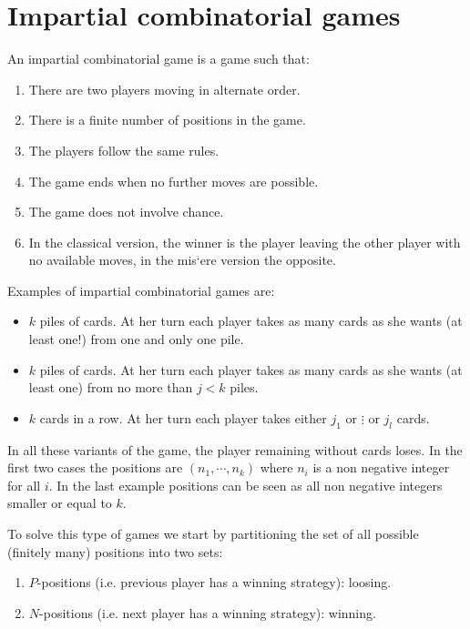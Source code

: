 \section{Impartial combinatorial games}

\begin{definition}
    An impartial combinatorial game is a game such that:
    \begin{enumerate}
        \item There are two players moving in alternate order.
        \item There is a finite number of positions in the game.
        \item The players follow the same rules.
        \item The game ends when no further moves are possible.
        \item The game does not involve chance.
        \item In the classical version, the winner is the player leaving the other player with no available moves, in the mis`ere version the opposite.
    \end{enumerate}
\end{definition}
\begin{example}
    Examples of impartial combinatorial games are: 
    \begin{itemize}
        \item $k$ piles of cards. At her turn each player takes as many cards as she wants (at least one!) from one and only one pile. 
        \item $k$ piles of cards. At her turn each player takes as many cards as she wants (at least one) from no more than $j < k$ piles. 
        \item $k$ cards in a row. At her turn each player takes either $j_1$ or $\vdots$ or $j_l$ cards. 
    \end{itemize}
    In all these variants of the game, the player remaining without cards loses.
    In the first two cases the positions are $(n_1, \cdots , n_k)$ where $n_i$ is a non negative integer for all $i$. 
    In the last example positions can be seen as all non negative integers smaller or equal to $k$.
\end{example}
To solve this type of games we start by partitioning the set of all possible (finitely many) positions into two sets:
\begin{enumerate}
    \item $P$-positions (i.e. previous player has a winning strategy): loosing.
    \item $N$-positions (i.e. next player has a winning strategy): winning.
\end{enumerate}
